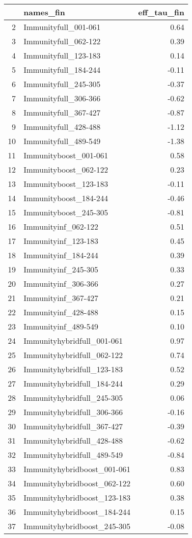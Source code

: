 \begin{table}[ht]
\centering
\begin{tabular}{rlr}
  \hline
 & names\_fin & eff\_tau\_fin \\ 
  \hline
2 & Immunityfull\_001-061 & 0.64 \\ 
  3 & Immunityfull\_062-122 & 0.39 \\ 
  4 & Immunityfull\_123-183 & 0.14 \\ 
  5 & Immunityfull\_184-244 & -0.11 \\ 
  6 & Immunityfull\_245-305 & -0.37 \\ 
  7 & Immunityfull\_306-366 & -0.62 \\ 
  8 & Immunityfull\_367-427 & -0.87 \\ 
  9 & Immunityfull\_428-488 & -1.12 \\ 
  10 & Immunityfull\_489-549 & -1.38 \\ 
  11 & Immunityboost\_001-061 & 0.58 \\ 
  12 & Immunityboost\_062-122 & 0.23 \\ 
  13 & Immunityboost\_123-183 & -0.11 \\ 
  14 & Immunityboost\_184-244 & -0.46 \\ 
  15 & Immunityboost\_245-305 & -0.81 \\ 
  16 & Immunityinf\_062-122 & 0.51 \\ 
  17 & Immunityinf\_123-183 & 0.45 \\ 
  18 & Immunityinf\_184-244 & 0.39 \\ 
  19 & Immunityinf\_245-305 & 0.33 \\ 
  20 & Immunityinf\_306-366 & 0.27 \\ 
  21 & Immunityinf\_367-427 & 0.21 \\ 
  22 & Immunityinf\_428-488 & 0.15 \\ 
  23 & Immunityinf\_489-549 & 0.10 \\ 
  24 & Immunityhybridfull\_001-061 & 0.97 \\ 
  25 & Immunityhybridfull\_062-122 & 0.74 \\ 
  26 & Immunityhybridfull\_123-183 & 0.52 \\ 
  27 & Immunityhybridfull\_184-244 & 0.29 \\ 
  28 & Immunityhybridfull\_245-305 & 0.06 \\ 
  29 & Immunityhybridfull\_306-366 & -0.16 \\ 
  30 & Immunityhybridfull\_367-427 & -0.39 \\ 
  31 & Immunityhybridfull\_428-488 & -0.62 \\ 
  32 & Immunityhybridfull\_489-549 & -0.84 \\ 
  33 & Immunityhybridboost\_001-061 & 0.83 \\ 
  34 & Immunityhybridboost\_062-122 & 0.60 \\ 
  35 & Immunityhybridboost\_123-183 & 0.38 \\ 
  36 & Immunityhybridboost\_184-244 & 0.15 \\ 
  37 & Immunityhybridboost\_245-305 & -0.08 \\ 
   \hline
\end{tabular}
\end{table}

